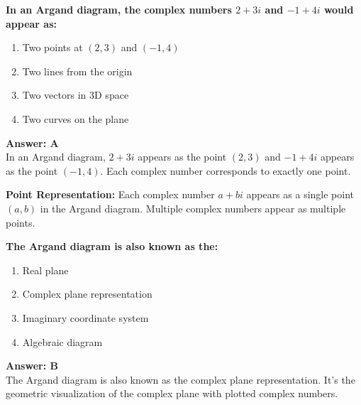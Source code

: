 \documentclass[12pt,a4paper]{article}
\begin{document}
\newpage
\begin{questiontitle}[MCQ 85]
\textbf{In an Argand diagram, the complex numbers \( 2 + 3i \) and \( -1 + 4i \) would appear as:}
\end{questiontitle}

\begin{partbox}[Options]
\begin{enumerate}[label=\Alph*.]
    \item Two points at \( (2, 3) \) and \( (-1, 4) \)
    \item Two lines from the origin
    \item Two vectors in 3D space
    \item Two curves on the plane
\end{enumerate}
\end{partbox}

\begin{answerstyle}
\textbf{Answer: A} \\
In an Argand diagram, \( 2 + 3i \) appears as the point \( (2, 3) \) and \( -1 + 4i \) appears as the point \( (-1, 4) \). Each complex number corresponds to exactly one point.
\end{answerstyle}

\begin{conceptbox}
\textbf{Point Representation:} Each complex number \( a + bi \) appears as a single point \( (a, b) \) in the Argand diagram. Multiple complex numbers appear as multiple points.
\end{conceptbox}

\newpage
\begin{questiontitle}[MCQ 86]
\textbf{The Argand diagram is also known as the:}
\end{questiontitle}

\begin{partbox}[Options]
\begin{enumerate}[label=\Alph*.]
    \item Real plane
    \item Complex plane representation
    \item Imaginary coordinate system
    \item Algebraic diagram
\end{enumerate}
\end{partbox}

\begin{answerstyle}
\textbf{Answer: B} \\
The Argand diagram is also known as the complex plane representation. It's the geometric visualization of the complex plane with plotted complex numbers.
\end{answerstyle}
\end{document}

